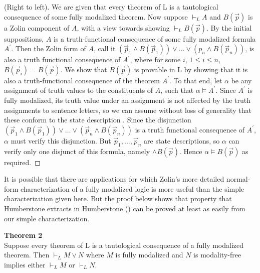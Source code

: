 \documentclass[
  11pt,
  letterpaper,
  DIV=11,
  numbers=noendperiod,
  twoside]{scrartcl}
\begin{document}
(Right to left). We are given that every theorem of L is a tautological
consequence of some fully modalized theorem. Now suppose \(\vdash_L A\)
and \(B(\vec{p})\) is a Zolin component of \(A\), with a view towards
showing \(\vdash_L B(\vec{p})\). By the initial suppositions, \(A\) is a
truth-functional consequence of some fully modalized formula
\(A^\prime\). Then the Zolin form of \(A\), call it
\((\vec{p}_1\wedge B(\vec{p}_1))\vee {\ldots}\vee (p_n\wedge B(\vec{p}_n))\),
is also a truth functional consequence of \(A^\prime\), where for some
\(i\), \(1\le i\le n\), \(B(\vec{p}_i)=B(\vec{p})\). We show that
\(B(\vec{p})\) is provable in L by showing that it is also a
truth-functional consequence of the theorem \(A^\prime\). To that end,
let \(\alpha\) be any assignment of truth values to the constituents of
\(A\), such that \(\alpha\models A^\prime\). Since \(A^\prime\) is fully
modalized, its truth value under an assignment is not affected by the
truth assignments to sentence letters, so we can assume without loss of
generality that these conform to the state description . Since the
disjunction
\((\vec{p}_1\wedge B(\vec{p}_1))\vee {\ldots}\vee (\vec{p}_n\wedge B(\vec{p}_n))\)
is a truth functional consequence of \(A^\prime\), \(\alpha\) must
verify this disjunction. But \(\vec{p}_1,{\ldots},\vec{p}_n\) are state
descriptions, so \(\alpha\) can verify only one disjunct of this
formula, namely \(\wedge B(\vec{p})\). Hence
\(\alpha\models B(\vec{p})\) as required.~◻

It is possible that there are applications for which Zolin's more
detailed normal-form characterization of a fully modalized logic is more
useful than the simple characterization given here. But the proof below
shows that property that Humberstone extracts in Humberstone
() can be proved at least as easily
from our simple characterization.

\textbf{Theorem 2}\\
Suppose every theorem of L is a tautological consequence of a fully
modalized theorem. Then \(\vdash_LM\vee N\) where \(M\) is fully
modalized and \(N\) is modality-free implies either \(\vdash_LM\) or
\(\vdash_LN\).
\end{document}
